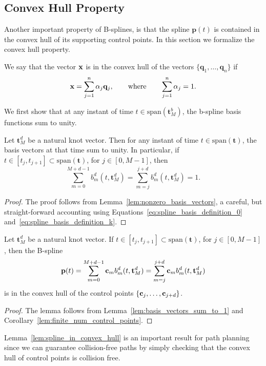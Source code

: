 \subsection{Convex Hull Property}

Another important property of B-splines, is that the spline $\mathbf{p}(t)$ is contained in the convex hull of its supporting control points.  In this section we formalize the convex hull property.

\begin{definition}
We say that the vector $\mathbf{x}$ is in the convex hull of the vectors $\{\mathbf{q}_1, \dots, \mathbf{q}_n\}$ if 
\[
\mathbf{x} = \sum_{j=1}^n \alpha_j \mathbf{q}_j, \qquad \text{where} \qquad \sum_{j=1}^n \alpha_j = 1.
\]	
\end{definition}

We first show that at any instant of time $t\in\text{span}(\mathbf{t}_M^b)$, the b-spline basis functions sum to unity.   

\begin{lemma} \label{lem:basis_vectors_sum_to_1}
	Let $\mathbf{t}_M^d$ be a natural knot vector.  Then for any instant of time $t\in\text{span}(\mathbf{t})$, the basis vectors at that time sum to unity.  In particular, if $t\in[t_j, t_{j+1}]\subset\text{span}(\mathbf{t})$, for $j\in[0,M-1]$, then
	\[
	\sum_{m=0}^{M+d-1} b_m^d(t, \mathbf{t}_M^d) =
	\sum_{m=j}^{j+d} b_m^d(t, \mathbf{t}_M^d) = 1.
	\]
\end{lemma}
\begin{proof}  The proof follows from Lemma~\ref{lem:nonzero_basis_vectors}, a careful, but straight-forward accounting using Equations~\eqref{eq:spline_basis_definition_0} and~\eqref{eq:spline_basis_definition_k}.	
\end{proof}


\begin{lemma}\label{lem:spline_in_convex_hull}
	Let $\mathbf{t}_M^d$ be a natural knot vector. 
	If $t\in[t_j, t_{j+1}]\subset\text{span}(\mathbf{t})$, for $j\in[0,M-1]$, then the B-spline
	\[
	\mathbf{p}(t) = \sum_{m=0}^{M+d-1} \mathbf{c}_m b_m^d(t, \mathbf{t}_M^d) = \sum_{m=j}^{j+d} \mathbf{c}_m b_m^d(t,  \mathbf{t}_M^d)
	\]
	is in the convex hull of the control points $\{\mathbf{c}_j, \dots, \mathbf{c}_{j+d}\}$.
\end{lemma}
\begin{proof}
	The lemma follows from Lemma~\ref{lem:basis_vectors_sum_to_1} and Corollary~\ref{lem:finite_num_control_points}.
\end{proof}
Lemma~\ref{lem:spline_in_convex_hull} is an important result for path planning since we can guarantee collision-free paths by simply checking that the convex hull of control points is collision free.

